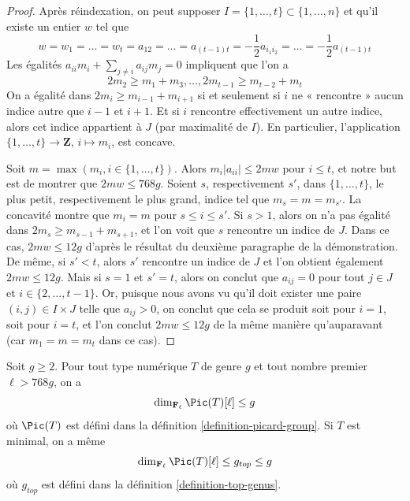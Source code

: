 \begin{proof}
\medskip\noindent
Après réindexation, on peut supposer $I = \{1, \ldots, t\} \subset \{1, \ldots, n\}$
et qu'il existe un entier $w$ tel que
$$
w = w_1 = \ldots = w_t =
a_{12} = \ldots = a_{(t - 1) t} =
-\frac{1}{2} a_{i_1i_2} = \ldots = -\frac{1}{2} a_{(t - 1) t}
$$
Les égalités $a_{ii}m_i + \sum_{j \not = i} a_{ij}m_j = 0$ impliquent
que l'on a
$$
2m_2 \geq m_1 + m_3, \ldots, 2m_{t - 1} \geq m_{t - 2} + m_t
$$
On a égalité dans $2m_i \geq m_{i - 1} + m_{i + 1}$
si et seulement si $i$ ne « rencontre » aucun indice autre que
$i - 1$ et $i + 1$. Et si $i$ rencontre effectivement
un autre indice, alors cet indice appartient à $J$ (par maximalité de $I$).
En particulier, l'application
$\{1, \ldots, t\} \to \mathbf{Z}$, $i \mapsto m_i$, est concave.

\medskip\noindent
Soit $m = \max(m_i, i \in \{1, \ldots, t\})$. Alors
$m_i|a_{ii}| \leq 2mw$ pour $i \leq t$, et
notre but est de montrer que $2mw \leq 768g$.
Soient $s$, respectivement $s'$, dans $\{1, \ldots, t\}$, le
plus petit, respectivement le plus grand, indice tel que $m_s = m = m_{s'}$.
La concavité montre que $m_i = m$ pour $s \leq i \leq s'$.
Si $s > 1$, alors on n'a pas égalité dans
$2m_s \geq m_{s - 1} + m_{s + 1}$,
et l'on voit que $s$ rencontre un indice de $J$.
Dans ce cas, $2mw \leq 12g$ d'après le résultat du deuxième paragraphe
de la démonstration.
De même, si $s' < t$, alors $s'$ rencontre un indice de $J$
et l'on obtient également $2mw \leq 12g$.
Mais si $s = 1$ et $s' = t$, alors on conclut
que $a_{ij} = 0$ pour tout $j \in J$ et $i \in \{2, \ldots, t - 1\}$.
Or, puisque nous avons vu qu'il doit exister une paire $(i, j) \in I \times J$
telle que $a_{ij} > 0$, on conclut que cela se produit soit pour
$i = 1$, soit pour $i = t$, et l'on conclut $2mw \leq 12g$
de la même manière qu'auparavant (car $m_1 = m = m_t$ dans ce cas).
\end{proof}

\begin{proposition}
\label{proposition-bound-picard-group}
Soit $g \geq 2$. Pour tout type numérique $T$ de genre $g$
et tout nombre premier $\ell > 768g$, on a
$$
\dim_{\mathbf{F}_\ell} \Pic(T)[\ell] \leq g
$$
où $\Pic(T)$ est défini dans la définition \ref{definition-picard-group}.
Si $T$ est minimal, on a même
$$
\dim_{\mathbf{F}_\ell} \Pic(T)[\ell] \leq g_{top} \leq g
$$
où $g_{top}$ est défini dans la définition \ref{definition-top-genus}.
\end{proposition}

